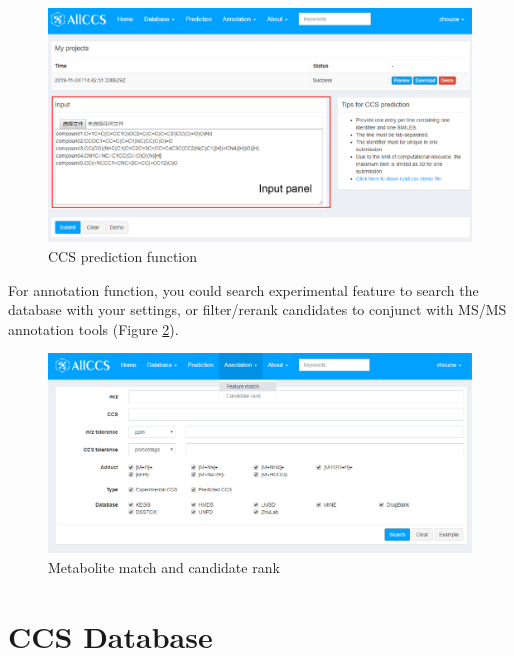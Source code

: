 \documentclass[12pt,]{book}
\begin{document}
\begin{figure}

{\centering \includegraphics{images/chapter1/prediction} 

}

\caption{CCS prediction function}\label{fig:FigPrediction}
\end{figure}

For annotation function, you could search experimental feature to search
the database with your settings, or filter/rerank candidates to conjunct
with MS/MS annotation tools (Figure \ref{fig:FigMatch}).

\begin{figure}

{\centering \includegraphics{images/chapter1/match} 

}

\caption{Metabolite match and candidate rank}\label{fig:FigMatch}
\end{figure}

\chapter{CCS Database}\label{chapter2}
\end{document}
